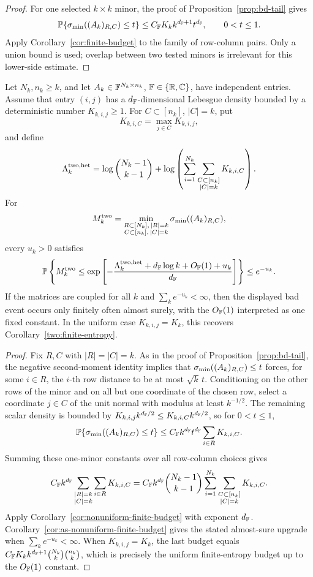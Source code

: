 \begin{proof}
For one selected \(k\times k\) minor, the proof of
Proposition~\ref{prop:bd-tail} gives
\[
  \mathbb{P}\{\sigma_{\min}((A_k)_{R,C})\le t\}
  \le C_{\mathbb{F}} K_k k^{d_{\mathbb{F}}+1}t^{d_{\mathbb{F}}},\qquad 0<t\le1.
\]
Apply Corollary~\ref{cor:finite-budget} to the family of row-column pairs.
Only a union bound is used; overlap between two tested minors is irrelevant for
this lower-side estimate.
\end{proof}

\begin{corollary}\label{two:heterogeneous-finite-budget}
Let \(N_k,n_k\ge k\), and let \(A_k\in\mathbb{F}^{N_k\times n_k}\),
\(\mathbb{F}\in\{\mathbb{R},\mathbb{C}\}\), have independent entries.  Assume that entry \((i,j)\)
has a \(d_{\mathbb{F}}\)-dimensional Lebesgue density bounded by a deterministic number
\(K_{k,i,j}\ge1\).  For \(C\subset[n_k]\), \(|C|=k\), put
\[
  K_{k,i,C}=\max_{j\in C}K_{k,i,j},
\]
and define
\[
  \Lambda_k^{\rm two,het}
  =
  \log\binom{N_k-1}{k-1}
  +\log\left(
      \sum_{i=1}^{N_k}\sum_{\substack{C\subset[n_k]\\ |C|=k}}K_{k,i,C}
    \right).
\]
For
\[
  M_k^{\rm two}
  =
  \min_{\substack{R\subset[N_k],\, |R|=k\\ C\subset[n_k],\, |C|=k}}
  \sigma_{\min}((A_k)_{R,C}),
\]
every \(u_k>0\) satisfies
\[
  \mathbb{P}\left\{
  M_k^{\rm two}\le
  \exp\left[-\frac{
  \Lambda_k^{\rm two,het}+d_{\mathbb{F}}\log k+O_{\mathbb{F}}(1)+u_k
  }{d_{\mathbb{F}}}\right]
  \right\}
  \le e^{-u_k}.
\]
If the matrices are coupled for all \(k\) and \(\sum_k e^{-u_k}<\infty\), then
the displayed bad event occurs only finitely often almost surely, with the
\(O_{\mathbb{F}}(1)\) interpreted as one fixed constant.  In the uniform case
\(K_{k,i,j}=K_k\), this recovers Corollary~\ref{two:finite-entropy}.
\end{corollary}

\begin{proof}
Fix \(R,C\) with \(|R|=|C|=k\).  As in the proof of
Proposition~\ref{prop:bd-tail}, the negative second-moment identity implies
that \(\sigma_{\min}((A_k)_{R,C})\le t\) forces, for some \(i\in R\), the \(i\)-th row
distance to be at most
\(\sqrt k\,t\).  Conditioning on the other rows of the minor and on all but one
coordinate of the chosen row, select a coordinate \(j\in C\) of the unit normal
with modulus at least \(k^{-1/2}\).  The remaining scalar density is bounded by
\(K_{k,i,j}k^{d_{\mathbb{F}}/2}\le K_{k,i,C}k^{d_{\mathbb{F}}/2}\), so for \(0<t\le1\),
\[
  \mathbb{P}\{\sigma_{\min}((A_k)_{R,C})\le t\}
  \le C_{\mathbb{F}} k^{d_{\mathbb{F}}}t^{d_{\mathbb{F}}}\sum_{i\in R}K_{k,i,C}.
\]
Summing these one-minor constants over all row-column choices gives
\[
  C_{\mathbb{F}} k^{d_{\mathbb{F}}}
  \sum_{\substack{|R|=k\\ |C|=k}}\sum_{i\in R}K_{k,i,C}
  =
  C_{\mathbb{F}} k^{d_{\mathbb{F}}}\binom{N_k-1}{k-1}
  \sum_{i=1}^{N_k}\sum_{\substack{C\subset[n_k]\\ |C|=k}}K_{k,i,C}.
\]
Apply Corollary~\ref{cor:nonuniform-finite-budget} with exponent \(d_{\mathbb{F}}\).
Corollary~\ref{cor:as-nonuniform-finite-budget} gives the stated almost-sure
upgrade when \(\sum_k e^{-u_k}<\infty\).
When \(K_{k,i,j}=K_k\), the last budget equals
\(C_{\mathbb{F}} K_k k^{d_{\mathbb{F}}+1}\binom{N_k}{k}\binom{n_k}{k}\), which is precisely the
uniform finite-entropy budget up to the \(O_{\mathbb{F}}(1)\) constant.
\end{proof}

